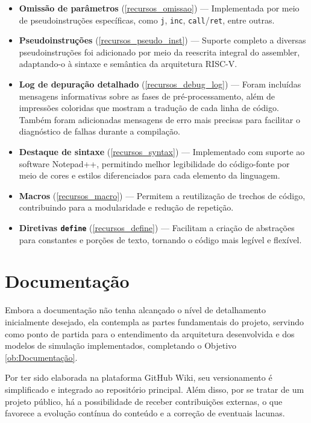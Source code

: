 \documentclass[
	12pt,				%
	openright,			%
	oneside,			%
	a4paper,			%
	english,			%
	french,				%
	spanish,			%
	brazil,				%
	]{abntex2}
\begin{document}
\begin{itemize}
    \item \textbf{Omissão de parâmetros} (\ref{recursos_omissao}) — Implementada por meio de pseudoinstruções específicas, como \texttt{j}, \texttt{inc}, \texttt{call}/\texttt{ret}, entre outras.

    \item \textbf{Pseudoinstruções} (\ref{recursos_pseudo_inst}) — Suporte completo a diversas pseudoinstruções foi adicionado por meio da reescrita integral do assembler, adaptando-o à sintaxe e semântica da arquitetura RISC-V.

    \item \textbf{Log de depuração detalhado} (\ref{recursos_debug_log}) — Foram incluídas mensagens informativas sobre as fases de pré-processamento, além de impressões coloridas que mostram a tradução de cada linha de código. Também foram adicionadas mensagens de erro mais precisas para facilitar o diagnóstico de falhas durante a compilação.

    \item \textbf{Destaque de sintaxe} (\ref{recursos_syntax}) — Implementado com suporte ao software Notepad++, permitindo melhor legibilidade do código-fonte por meio de cores e estilos diferenciados para cada elemento da linguagem.

    \item \textbf{Macros} (\ref{recursos_macro}) — Permitem a reutilização de trechos de código, contribuindo para a modularidade e redução de repetição.

    \item \textbf{Diretivas \texttt{define}} (\ref{recursos_define}) — Facilitam a criação de abstrações para constantes e porções de texto, tornando o código mais legível e flexível.
\end{itemize}

\section{Documentação}

Embora a documentação não tenha alcançado o nível de detalhamento inicialmente desejado, ela contempla as partes fundamentais do projeto, servindo como ponto de partida para o entendimento da arquitetura desenvolvida e dos modelos de simulação implementados, completando o Objetivo \ref{ob:Documentação}.

Por ter sido elaborada na plataforma GitHub Wiki, seu versionamento é simplificado e integrado ao repositório principal. Além disso, por se tratar de um projeto público, há a possibilidade de receber contribuições externas, o que favorece a evolução contínua do conteúdo e a correção de eventuais lacunas.
\end{document}
